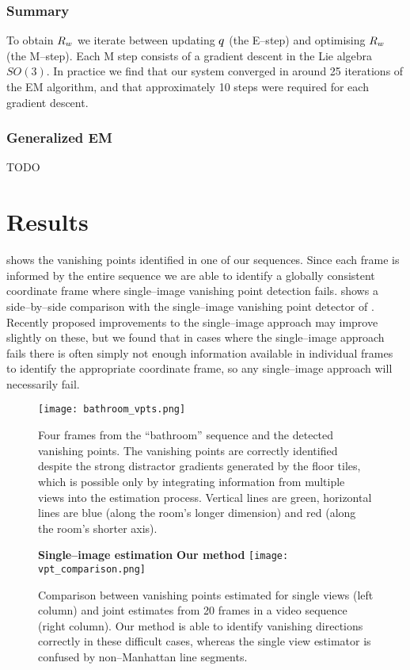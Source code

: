 \subsubsection{Summary}
To obtain $\SceneR$ we iterate between updating $\PosteriorEst$ (the
E--step) and optimising $\SceneR$ (the M--step). Each M step consists
of a gradient descent in the Lie algebra $SO(3)$. In practice we find
that our system converged in around 25 iterations of the EM algorithm,
and that approximately 10 steps were required for each gradient
descent.

\subsubsection{Generalized EM}

TODO

\section{Results}

 shows the vanishing points identified in one of
our sequences. Since each frame is informed by the entire sequence we
are able to identify a globally consistent coordinate frame where
single--image vanishing point detection fails. 
shows a side--by--side comparison with the single--image vanishing
point detector of \cite{Zhang02}. Recently proposed improvements to
the single--image approach \cite{Tardif09} may improve slightly on
these, but we found that in cases where the single--image approach
fails there is often simply not enough information available in
individual frames to identify the appropriate coordinate frame, so any
single--image approach will necessarily fail.

\begin{figure}[tb]
  \centering
  \texttt{[image: bathroom\_vpts.png]}
  \caption{Four frames from the ``bathroom'' sequence and the detected
    vanishing points. The vanishing points are correctly identified
    despite the strong distractor gradients generated by the floor
    tiles, which is possible only by integrating information from
    multiple views into the estimation process. Vertical lines are
    green, horizontal lines are blue (along the room's longer
    dimension) and red (along the room's shorter axis).}
  \label{fig:bathroom-vpts}
\end{figure}

\begin{figure}[tb]
  \centering
      {\bf Single--image estimation}\cite{Zhang02} \hspace{2.25cm}
      {\bf Our method}
  \texttt{[image: vpt\_comparison.png]}
  \caption{Comparison between vanishing points estimated for single
    views (left column) and joint estimates from 20 frames in a video
    sequence (right column). Our method is able to identify vanishing
    directions correctly in these difficult cases, whereas the single
    view estimator is confused by non--Manhattan line segments.}
  \label{fig:vpt-comparison}
\end{figure}

